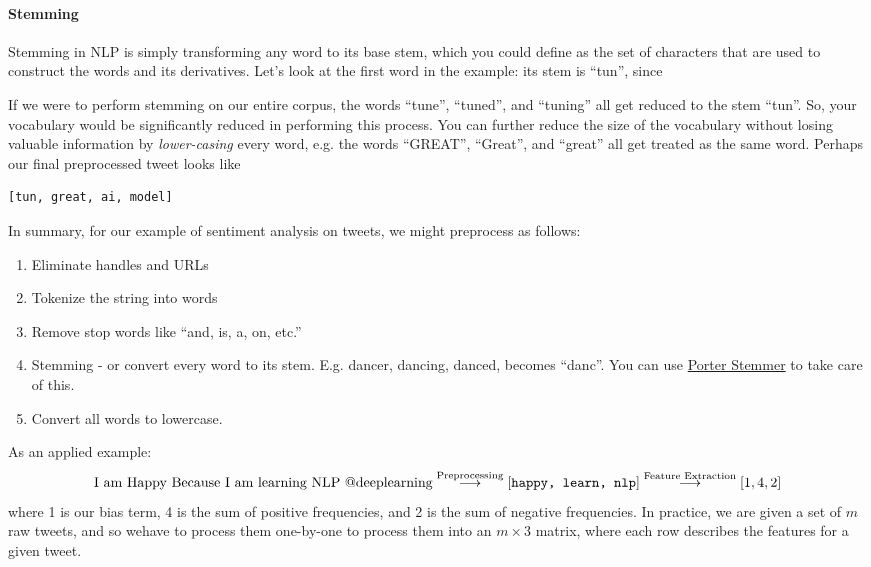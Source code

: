 \documentclass[12pt]{article}
\begin{document}
\paragraph{Stemming}
Stemming in NLP is simply transforming any word to its base stem, which you could define as the set of characters that are used to construct the words and its derivatives. Let's look at the first word in the example: its stem is ``tun'', since
\begin{center}
\end{center}

If we were to perform stemming on our entire corpus, the words ``tune'', ``tuned'', and ``tuning'' all get reduced to the stem ``tun''. So, your vocabulary would be significantly reduced in performing this process. You can further reduce the size of the vocabulary without losing valuable information by \emph{lower-casing} every word, e.g. the words ``GREAT'', ``Great'', and ``great'' all get treated as the same word. Perhaps our final preprocessed tweet looks like
\begin{verbatim}
[tun, great, ai, model]
\end{verbatim}

In summary, for our example of sentiment analysis on tweets, we might preprocess as follows:
\begin{enumerate}
\item Eliminate handles and URLs
\item Tokenize the string into words
\item Remove stop words like ``and, is, a, on, etc.''
\item Stemming - or convert every word to its stem. E.g. dancer, dancing,   danced, becomes ``danc''. You can use \href{https://tartarus.org/martin/PorterStemmer/}{Porter Stemmer} to take care of this.
\item Convert all words to lowercase.
\end{enumerate}

As an applied example:
$$
\textrm{I am Happy Because I am learning NLP @deeplearning} \overset{\small \textrm{Preprocessing}}{\longrightarrow} [\texttt{happy, learn, nlp}] \overset{\small \textrm{Feature Extraction}}{\longrightarrow} [1, 4, 2]
$$
where 1 is our bias term, 4 is the sum of positive frequencies, and 2 is the sum of negative frequencies.
In practice, we are given a set of $m$ raw tweets, and so wehave to process them one-by-one to process them into an $m \times 3$ matrix, where each row describes the features for a given tweet.
\end{document}
